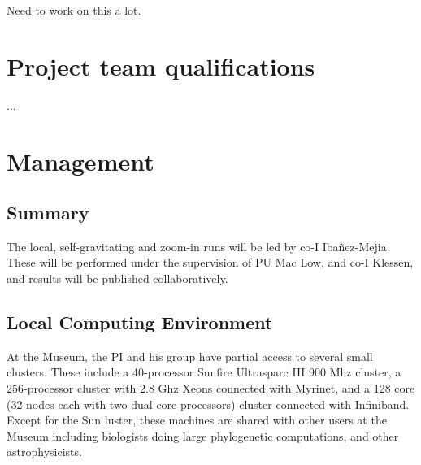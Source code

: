 \documentclass[12pt,a4paper]{article}
\begin{document}
Need to work on this a lot.


\section{Project team qualifications}

...

\section{Management}

\subsection{Summary}

The local, self-gravitating and zoom-in runs will be led by co-I Iba{\~n}ez-Mejia. 
These will be performed under the supervision of PU Mac Low, and co-I Klessen, and results will be published collaboratively.

\subsection{Local Computing Environment}

At the Museum, the PI and his group have partial access to several small clusters. 
These include a 40-processor Sunfire Ultrasparc III 900 Mhz cluster, a 256-processor cluster with 2.8 Ghz Xeons connected with Myrinet, and a 128 core (32 nodes each with two dual core processors) cluster connected with Infiniband.
Except for the Sun luster, these machines are shared with other users at the Museum including biologists doing large phylogenetic computations, and other astrophysicists. 


%
%




\end{document}
